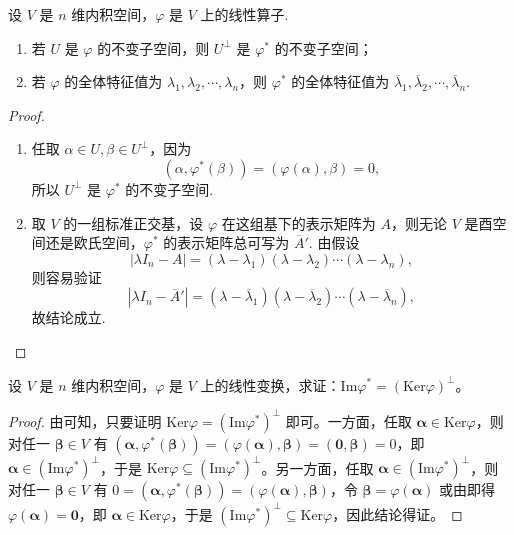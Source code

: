 \documentclass[../../main.tex]{subfiles}%
\begin{document}
\begin{proposition}\label{proposition:线性算子的正交补空间就是伴随算子的不变子空间}
设 $V$ 是 $n$ 维内积空间，$\varphi$ 是 $V$ 上的线性算子.
\begin{enumerate}[(1)]
\item 若 $U$ 是 $\varphi$ 的不变子空间，则 $U^{\perp}$ 是 $\varphi^*$ 的不变子空间；

\item 若 $\varphi$ 的全体特征值为 $\lambda_1,\lambda_2,\cdots,\lambda_n$，则 $\varphi^*$ 的全体特征值为 $\overline{\lambda}_1,\overline{\lambda}_2,\cdots,\overline{\lambda}_n$.
\end{enumerate}
\end{proposition}
\begin{proof}
\begin{enumerate}[(1)]
\item 任取 $\alpha \in U, \beta \in U^{\perp}$，因为
\[
(\alpha,\varphi^*(\beta)) = (\varphi(\alpha),\beta) = 0,
\]
所以 $U^{\perp}$ 是 $\varphi^*$ 的不变子空间.

\item 取 $V$ 的一组标准正交基，设 $\varphi$ 在这组基下的表示矩阵为 $A$，则无论 $V$ 是酉空间还是欧氏空间，$\varphi^*$ 的表示矩阵总可写为 $\overline{A}'$. 由假设
\[
|\lambda I_n - A| = (\lambda - \lambda_1)(\lambda - \lambda_2)\cdots(\lambda - \lambda_n),
\]
则容易验证
\[
|\lambda I_n - \overline{A}'| = (\lambda - \overline{\lambda}_1)(\lambda - \overline{\lambda}_2)\cdots(\lambda - \overline{\lambda}_n),
\]
故结论成立.
\end{enumerate}
\end{proof}

\begin{proposition}\label{proposition:例9.27}
设 $V$ 是 $n$ 维内积空间，$\varphi$ 是 $V$ 上的线性变换，求证：$\mathrm{Im}\varphi^* = (\mathrm{Ker}\varphi)^\perp$。
\end{proposition}
\begin{proof}
由可知，只要证明 $\mathrm{Ker}\varphi = (\mathrm{Im}\varphi^*)^\perp$ 即可。一方面，任取 $\boldsymbol{\alpha} \in \mathrm{Ker}\varphi$，则对任一 $\boldsymbol{\beta} \in V$ 有 $(\boldsymbol{\alpha}, \varphi^*(\boldsymbol{\beta})) = (\varphi(\boldsymbol{\alpha}), \boldsymbol{\beta}) = (\boldsymbol{0}, \boldsymbol{\beta}) = 0$，即 $\boldsymbol{\alpha} \in (\mathrm{Im}\varphi^*)^\perp$，于是 $\mathrm{Ker}\varphi \subseteq (\mathrm{Im}\varphi^*)^\perp$。另一方面，任取 $\boldsymbol{\alpha} \in (\mathrm{Im}\varphi^*)^\perp$，则对任一 $\boldsymbol{\beta} \in V$ 有 $0 = (\boldsymbol{\alpha}, \varphi^*(\boldsymbol{\beta})) = (\varphi(\boldsymbol{\alpha}), \boldsymbol{\beta})$，令 $\boldsymbol{\beta} = \varphi(\boldsymbol{\alpha})$ 或由即得 $\varphi(\boldsymbol{\alpha}) = \boldsymbol{0}$，即 $\boldsymbol{\alpha} \in \mathrm{Ker}\varphi$，于是 $(\mathrm{Im}\varphi^*)^\perp \subseteq \mathrm{Ker}\varphi$，因此结论得证。
\end{proof}
\end{document}
